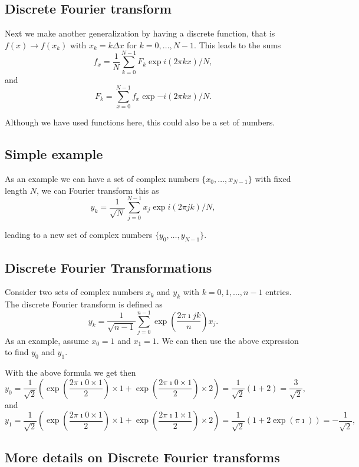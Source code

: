 \documentclass[%
oneside,                 %
final,                   %
10pt]{article}
\begin{document}
\subsection{Discrete Fourier transform}

Next we make another generalization by having a discrete function,
that is $f(x) \rightarrow f(x_k)$ with $x_k = k\Delta x$ for $k=0,\dots, N-1$. This leads to the sums
\[
f_x = \frac{1}{N} \sum_{k=0}^{N-1}F_k \exp{i(2\pi kx)/N},
\]
and
\[
F_k = \sum_{x=0}^{N-1}f_x \exp{-i(2\pi kx)/N}.
\]

Although we have used functions here, this could also be a set of
numbers.

\subsection{Simple example}

As an example we can have a set of complex numbers
$\{x_0,\dots,x_{N-1}\}$ with fixed length $N$, we can Fourier
transform this as
\[
y_k = \frac{1}{\sqrt{N}} \sum_{j=0}^{N-1} x_j \exp{i(2\pi jk)/N},
\]

leading to a new set of complex numbers $\{ y_0,\dots,y_{N-1}\}$. 

\subsection{Discrete Fourier Transformations}

Consider two sets of complex numbers $x_k$ and $y_k$ with
$k=0,1,\dots,n-1$ entries. The discrete Fourier transform is defined
as
\[
y_k = \frac{1}{\sqrt{n-1}} \sum_{j=0}^{n-1} \exp{(\frac{2\pi\imath jk}{n})} x_j.
\]
As an example, assume $x_0=1$ and $x_1=1$. We can then use the above expression to find $y_0$ and $y_1$.

With the above formula we get then
\[
y_0 = \frac{1}{\sqrt{2}} \left( \exp{(\frac{2\pi\imath 0\times 1}{2})} \times 1+\exp{(\frac{2\pi\imath 0\times 1}{2})}\times 2\right)=\frac{1}{\sqrt{2}}(1+2)=\frac{3}{\sqrt{2}},
\]
and
\[
y_1 = \frac{1}{\sqrt{2}} \left( \exp{(\frac{2\pi\imath 0\times 1}{2})} \times 1+\exp{(\frac{2\pi\imath 1\times 1}{2})}\times 2\right)=\frac{1}{\sqrt{2}}(1+2\exp{(\pi\imath)})=-\frac{1}{\sqrt{2}},
\]

\subsection{More details on Discrete Fourier transforms}
\end{document}
